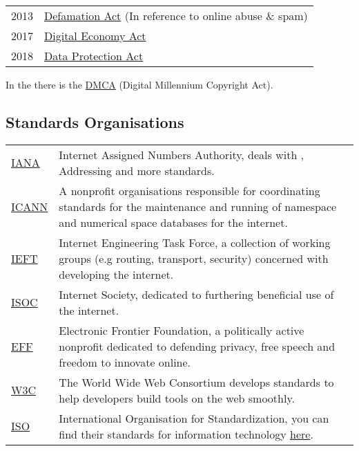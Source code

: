 \documentclass{report}
\begin{document}
\begin{center}
\begin{tabular}{l l}
		2013 & \href{https://www.legislation.gov.uk/ukpga/2013/26/contents}{Defamation Act} (In reference to online abuse \& spam)                                     \\
		2017 & \href{https://www.legislation.gov.uk/ukpga/2017/30/contents}{Digital Economy Act}                                                                       \\
		2018 & \href{https://www.legislation.gov.uk/ukpga/2018/12/contents}{Data Protection Act}                                                                       \\
	\end{tabular}
\end{center}
In the  there is the \href{https://www.copyright.gov/dmca/}{DMCA} (Digital Millennium Copyright Act).
\subsection*{Standards Organisations}
\begin{center}
	\begin{tabular}{l p{}}
		\href{https://www.iana.org/}{IANA}            & Internet Assigned Numbers Authority, deals with \keyword{DNS}, \keyword{IP} Addressing and more standards.                                                             \\
		\href{https://www.icann.org/}{ICANN}          & A nonprofit organisations responsible for coordinating standards for the maintenance and running of namespace and numerical space databases for the internet.          \\
		\href{https://www.ietf.org/}{IEFT}            & Internet Engineering Task Force, a collection of working groups (e.g routing, transport, security) concerned with developing the internet.                             \\
		\href{https://www.internetsociety.org/}{ISOC} & Internet Society, dedicated to furthering beneficial use of the internet.                                                                                              \\
		\href{https://www.eff.org/}{EFF}              & Electronic Frontier Foundation, a politically active nonprofit dedicated to defending privacy, free speech and freedom to innovate online.                             \\
		\href{https://www.w3.org/standards/}{W3C}     & The World Wide Web Consortium develops standards to help developers build tools on the web smoothly.                                                                   \\
		\href{https://www.iso.org/}{ISO}              & International Organisation for Standardization, you can find their standards for information technology \href{https://www.iso.org/committee/45020/x/catalogue/}{here}. \\
	\end{tabular}
\end{center}
\end{document}
